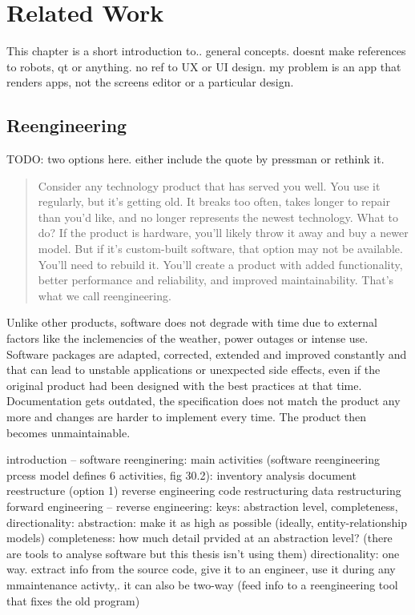 \chapter{Related Work}
This chapter is a short introduction to.. general concepts. doesnt make references to
robots, qt or anything. no ref to UX or UI design. my problem is an app that renders
apps, not the screens editor or a particular design.

\section{Reengineering}
TODO: two options here. either include the  quote by pressman or rethink it.
\begin{quote} 
Consider any technology product that has served you well. 
You use it regularly, but it's getting old. 
It breaks too often, takes longer to repair than you'd like, and no longer represents the newest technology.
What to do? If the product is hardware, you'll likely throw it away and buy a newer model.
But if it's custom-built software, that option may not be available. 
You'll need to rebuild it. 
You'll create a product with added functionality, better performance and reliability, and improved maintainability.
That's what we call reengineering. \cite{Pressman:2007}
\end{quote}

Unlike other products, software does not degrade with time due to external factors like the inclemencies of the weather, power outages or intense use.
Software packages are adapted, corrected, extended and improved constantly and that can lead to unstable applications or unexpected side effects, even if the original product had been designed with the best practices at that time.
Documentation gets outdated, the specification does not match the product any more and changes are harder to implement every time. %
The product then becomes unmaintainable. 


introduction
--
software reenginering:
main activities (software reengineering prcess model defines 6 activities, fig 30.2):
inventory analysis
document reestructure (option 1)
reverse engineering
code restructuring
data restructuring
forward engineering
--
reverse engineering:
keys: abstraction level, completeness, directionality:
abstraction: make it as high as possible (ideally, entity-relationship models)
completeness: how much detail prvided at an abstraction level?
(there are tools to analyse software but this thesis isn't using them)
directionality: one way. extract info from the source code, give it to an engineer, use it during any mmaintenance activty,. it can also be two-way (feed info to a reengineering tool that fixes the old program)

